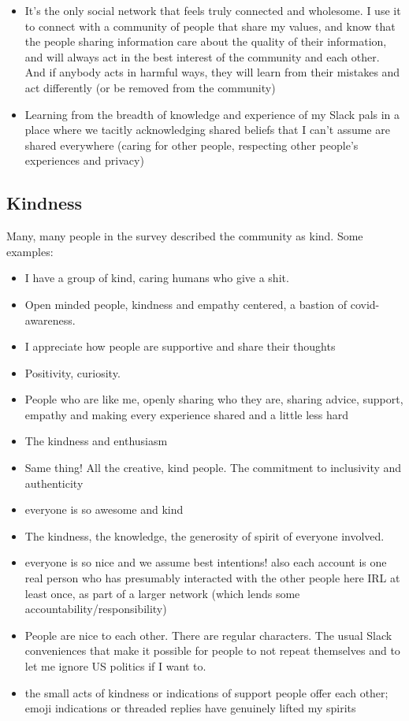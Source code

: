 \documentclass[
]{book}
\providecommand{\tightlist}{%
  \setlength{\itemsep}{0pt}\setlength{\parskip}{0pt}}
\begin{document}
\begin{itemize}
\item
  It's the only social network that feels truly connected and wholesome. I use it to connect with a community of people that share my values, and know that the people sharing information care about the quality of their information, and will always act in the best interest of the community and each other. And if anybody acts in harmful ways, they will learn from their mistakes and act differently (or be removed from the community)
\item
  Learning from the breadth of knowledge and experience of my Slack pals in a place where we tacitly acknowledging shared beliefs that I can't assume are shared everywhere (caring for other people, respecting other people's experiences and privacy)
\end{itemize}

\subsection{Kindness}\label{kindness}

Many, many people in the survey described the community as kind. Some examples:

\begin{itemize}
\tightlist
\item
  I have a group of kind, caring humans who give a shit.
\item
  Open minded people, kindness and empathy centered, a bastion of covid-awareness.
\item
  I appreciate how people are supportive and share their thoughts
\item
  Positivity, curiosity.
\item
  People who are like me, openly sharing who they are, sharing advice, support, empathy and making every experience shared and a little less hard
\item
  The kindness and enthusiasm
\item
  Same thing! All the creative, kind people. The commitment to inclusivity and authenticity
\item
  everyone is so awesome and kind
\item
  The kindness, the knowledge, the generosity of spirit of everyone involved.
\item
  everyone is so nice and we assume best intentions! also each account is one real person who has presumably interacted with the other people here IRL at least once, as part of a larger network (which lends some accountability/responsibility)
\item
  People are nice to each other. There are regular characters. The usual Slack conveniences that make it possible for people to not repeat themselves and to let me ignore US politics if I want to.
\item
  the small acts of kindness or indications of support people offer each other; emoji indications or threaded replies have genuinely lifted my spirits
\end{itemize}
\end{document}
